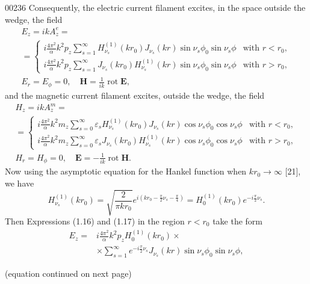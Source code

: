 \begin{scanpage}{0023}{6}
Consequently, the electric current filament excites, in the space outside the wedge, the field
\[\begin{gathered}E_z=ikA_z^e=\\=\begin{cases}\displaystyle i\frac{4\pi^2}{\alpha}k^2p_z\sum_{s=1}^\infty H_{\nu_s}^{(1)}(kr_0)J_{\nu_s}(kr)\sin\nu_s\phi_0\sin\nu_s\phi&\text{with }r<r_0,\\\displaystyle i\frac{4\pi^2}{\alpha}k^2p_z\sum_{s=1}^\infty J_{\nu_s}(kr_0)H_{\nu_s}^{(1)}(kr)\sin\nu_s\phi_0\sin\nu_s\phi&\text{with }r>r_0,\end{cases}\\E_r=E_\phi=0,\quad\mathbf H=\frac1{ik}\operatorname{rot}\mathbf E,\end{gathered}\tag{1.16}\]
and the magnetic current filament excites, outside the wedge, the field
\[\begin{gathered}H_z=ikA_z^m=\\=\begin{cases}\displaystyle i\frac{4\pi^2}{\alpha}k^2m_z\sum_{s=0}^\infty\varepsilon_sH_{\nu_s}^{(1)}(kr_0)J_{\nu_s}(kr)\cos\nu_s\phi_0\cos\nu_s\phi&\text{with }r<r_0,\\\displaystyle i\frac{4\pi^2}{\alpha}k^2m_z\sum_{s=0}^\infty\varepsilon_sJ_{\nu_s}(kr_0)H_{\nu_s}^{(1)}(kr)\cos\nu_s\phi_0\cos\nu_s\phi&\text{with }r>r_0,\end{cases}\\H_r=H_\phi=0,\quad\mathbf E=-\frac1{ik}\operatorname{rot}\mathbf H.\end{gathered}\tag{1.17}\]
Now using the asymptotic equation for the Hankel function when $kr_0\to\infty$ [21], we have
\[H_{\nu_s}^{(1)}(kr_0)=\sqrt{\frac2{\pi kr_0}}e^{i(kr_0-\frac\pi2\nu_s-\frac\pi4)}=H_0^{(1)}(kr_0)e^{-i\frac\pi2\nu_s}.\tag{1.18}\]
Then Expressions (1.16) and (1.17) in the region $r<r_0$ take the form
\[\begin{aligned}E_z={}&i\frac{4\pi^2}{\alpha}k^2p_zH_0^{(1)}(kr_0)\times\\&\times\sum_{s=1}^{\infty}e^{-i\frac\pi2\nu_s}J_{\nu_s}(kr)\sin\nu_s\phi_0\sin\nu_s\phi,\end{aligned}\]
\begin{flushright}(equation continued on next page)\end{flushright}
\end{scanpage}
